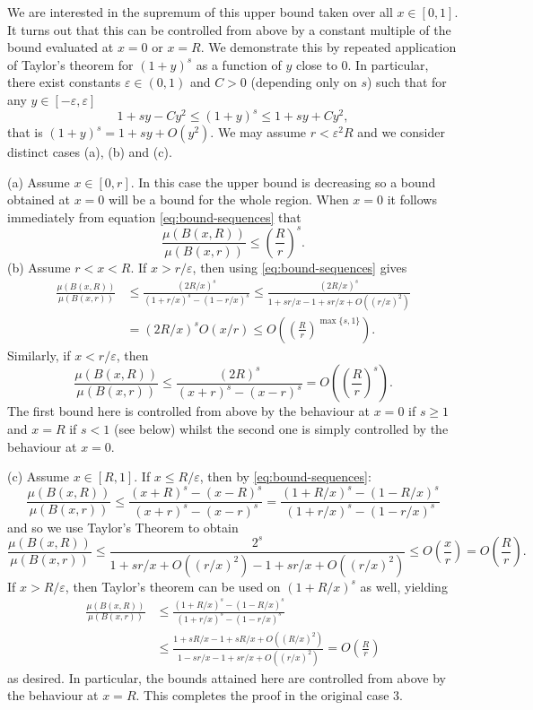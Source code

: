 We are interested in the supremum of this upper bound taken over all $x \in [0,1]$.  It turns out that this can be controlled from above by a constant  multiple of the bound evaluated at $x=0$ or $x=R$.  We demonstrate this by repeated application of Taylor's theorem for $(1+y)^s$ as a function of $y$ close to 0. In particular,   there exist constants $\varepsilon \in (0,1)$ and $C > 0$ (depending only on $s$) such that for any $y \in [-\varepsilon, \varepsilon]$
\[
1 + s y - C y^2 \le (1+y)^s \le 1 + s y + C y^2,
\]
that is $ (1+y)^s = 1 + s y +O( y^2)$.  We may assume $r<\varepsilon^2 R$ and we consider distinct cases (a), (b) and (c).



\noindent (a) Assume $x\in [0,r]$. In this case the upper bound is decreasing so a bound obtained at $x = 0$ will be a bound for the whole region. When $x=0$ it follows immediately from equation \eqref{eq:bound-sequences} that
\[
\frac{\mu(B(x,R))}{\mu(B(x,r))} \le \left(\frac{R}{r}\right)^s.
\]
\noindent (b) Assume $r < x < R$. If  $x > r/\varepsilon$, then using \eqref{eq:bound-sequences} gives
\begin{align*}
\frac{\mu(B(x,R))}{\mu(B(x,r))} &\le \frac{(2R/x)^s}{(1+r/x)^s - (1-r/x)^s} \le \frac{(2R/x)^s}{1+sr/x-1+sr/x + O((r/x)^2)}\\ 
&=  (2R/x)^s O(x/r) \le O\left(\left(\frac{R}{r}\right)^{\max\{s,1\}}\right).    
\end{align*}
Similarly, if $x < r/\varepsilon$, then 
\[
\frac{\mu(B(x,R))}{\mu(B(x,r))} \le \frac{(2R)^s}{(x+r)^s - (x-r)^s} = O\left(\left(\frac{R}{r}\right)^s\right).
\]
The first bound here is controlled from above by the behaviour at  $x=0$ if $s \geq 1$ and $x=R$ if $s <1$ (see below) whilst the second one is simply controlled by the behaviour at $x=0$. 


\noindent (c) Assume  $x \in [R,1]$. If $x \leq R/\varepsilon$, then by \eqref{eq:bound-sequences}:
\[
\frac{\mu(B(x,R))}{\mu(B(x,r))} \le \frac{(x+R)^s - (x-R)^s}{(x+r)^s - (x-r)^s} = \frac{(1+R/x)^s - (1-R/x)^s}{(1+r/x)^s - (1-r/x)^s}
\]
and so we use Taylor's Theorem  to obtain
\[
\frac{\mu(B(x,R))}{\mu(B(x,r))} \le \frac{2^s}{1+sr/x + O((r/x)^2)- 1 + sr/x + O((r/x)^2)} \le O\left(\frac{x}{r}\right) = O\left(\frac{R}{r}\right).
\]
If $x > R/\varepsilon$, then  Taylor's theorem can be used on $(1+R/x)^s$ as well, yielding
\begin{align*}
    \frac{\mu(B(x,R))}{\mu(B(x,r))} &\le \frac{(1+R/x)^s - (1-R/x)^s}{(1+r/x)^s - (1-r/x)^s} \\
    &\le \frac{1+sR/x - 1 + sR/x + O((R/x)^2)}{1-sr/x -1 + sr/x + O((r/x)^2)} = O\left(\frac{R}{r}\right)
\end{align*}
as desired. In particular, the bounds attained here are controlled from above by the  behaviour at $x= R$.   This completes the proof in the original case 3.



